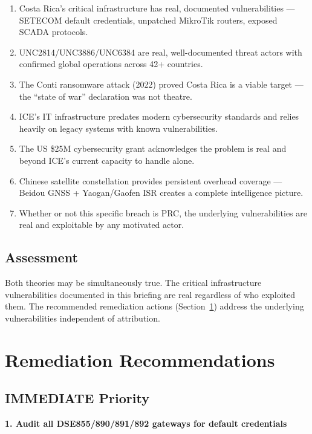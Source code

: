 \documentclass[11pt,a4paper]{article}
\begin{document}
\begin{enumerate}[leftmargin=1.5cm]
\item Costa Rica's critical infrastructure has real, documented vulnerabilities --- SETECOM default credentials, unpatched MikroTik routers, exposed SCADA protocols.
\item UNC2814/UNC3886/UNC6384 are real, well-documented threat actors with confirmed global operations across 42+ countries.
\item The Conti ransomware attack (2022) proved Costa Rica is a viable target --- the ``state of war'' declaration was not theatre.
\item ICE's IT infrastructure predates modern cybersecurity standards and relies heavily on legacy systems with known vulnerabilities.
\item The US \$25M cybersecurity grant acknowledges the problem is real and beyond ICE's current capacity to handle alone.
\item Chinese satellite constellation provides persistent overhead coverage --- Beidou GNSS + Yaogan/Gaofen ISR creates a complete intelligence picture.
\item Whether or not this specific breach is PRC, the underlying vulnerabilities are real and exploitable by any motivated actor.
\end{enumerate}

\subsection{Assessment}

Both theories may be simultaneously true. The critical infrastructure vulnerabilities documented in this briefing are real regardless of who exploited them. The recommended remediation actions (Section~\ref{sec:recommendations}) address the underlying vulnerabilities independent of attribution.

\section{Remediation Recommendations}
\label{sec:recommendations}

\subsection{IMMEDIATE Priority}

\textbf{1. Audit all DSE855/890/891/892 gateways for default credentials}
\end{document}
